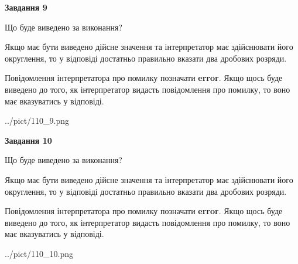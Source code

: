 \documentclass[12pt, ukrainian]{article}
\begin{document}
{\begin {Large}
{\begin {center}\textbf{Завдання 9}\end {center}}\par
Що буде виведено за виконання? \par

Якщо має бути виведено дійсне значення та інтерпретатор має здійснювати його округлення, 
то у відповіді достатньо правильно вказати два дробових розряди.

Повідомлення інтерпретатора про помилку позначати \textbf{error}.
Якщо щось буде виведено до того, як інтерпретатор видасть повідомлення про помилку, 
то воно має вказуватись у відповіді. \par

\begin{center}
	{../pict/110_9.png}
\end{center}
\newpage

{\begin {center}\textbf{Завдання 10}\end {center}}\par
Що буде виведено за виконання? \par

Якщо має бути виведено дійсне значення та інтерпретатор має здійснювати його округлення, 
то у відповіді достатньо правильно вказати два дробових розряди.

Повідомлення інтерпретатора про помилку позначати \textbf{error}.
Якщо щось буде виведено до того, як інтерпретатор видасть повідомлення про помилку, 
то воно має вказуватись у відповіді. \par

\begin{center}
	{../pict/110_10.png}
\end{center}
\newpage

\end {Large}}
\end{document}
